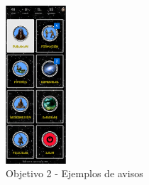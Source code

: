 \newpage

\begin{figure}[ht]
	\centering
	\includegraphics[width=0.2\textwidth]{imagenes/secciones/padawan/home.png}
	\caption{Objetivo 2 - Ejemplos de avisos}
	\label{objetivoIm2}
\end{figure}

